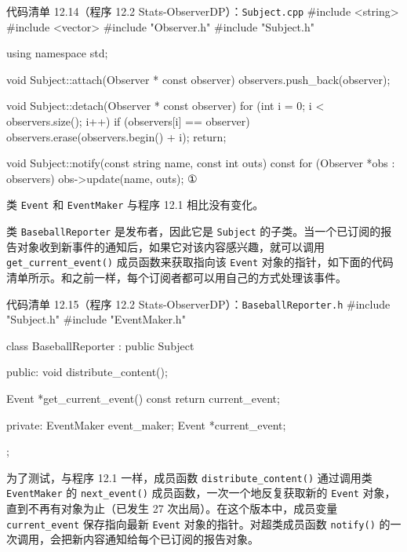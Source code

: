 \begin{codeboxt}{代码清单 12.14（程序 12.2 Stats-ObserverDP）：\texttt{Subject.\allowbreak{}cpp}}
#include <string>
#include <vector>
#include "Observer.h"
#include "Subject.h"

using namespace std;

void Subject::attach(Observer * const observer)
{
    observers.push_back(observer);
}

void Subject::detach(Observer * const observer)
{
    for (int i = 0; i < observers.size(); i++)
    {
        if (observers[i] == observer)
        {
            observers.erase(observers.begin() + i);
            return;
        }
    }
}

void Subject::notify(const string name, const int outs) const
{
    for (Observer *obs : observers) obs->update(name, outs); ①
}
\end{codeboxt}
\par

类 \texttt{Event} 和 \texttt{Event\allowbreak{}Maker} 与程序 12.1 相比没有变化。

类 \texttt{Baseball\allowbreak{}Reporter} 是发布者，因此它是 \texttt{Subject} 的子类。当一个已订阅的报告对象收到新事件的通知后，如果它对该内容感兴趣，就可以调用 \texttt{get\_\allowbreak{}current\_\allowbreak{}event(\allowbreak{})\allowbreak{}} 成员函数来获取指向该 \texttt{Event} 对象的指针，如下面的代码清单所示。和之前一样，每个订阅者都可以用自己的方式处理该事件。

\begin{codeboxt}{代码清单 12.15（程序 12.2 Stats-ObserverDP）：\texttt{Baseball\allowbreak{}Reporter.\allowbreak{}h}}
#include "Subject.h"
#include "EventMaker.h"

class BaseballReporter : public Subject
{
public:
    void distribute_content();

    Event *get_current_event() const { return current_event; }

private:
    EventMaker event_maker;
    Event *current_event;
};
\end{codeboxt}

为了测试，与程序 12.1 一样，成员函数 \texttt{distribute\_\allowbreak{}content(\allowbreak{})\allowbreak{}} 通过调用类 \texttt{Event\allowbreak{}Maker} 的 \texttt{next\_\allowbreak{}event(\allowbreak{})\allowbreak{}} 成员函数，一次一个地反复获取新的 \texttt{Event} 对象，直到不再有对象为止（已发生 27 次出局）。在这个版本中，成员变量 \texttt{current\_\allowbreak{}event} 保存指向最新 \texttt{Event} 对象的指针。对超类成员函数 \texttt{notify()} 的一次调用，会把新内容通知给每个已订阅的报告对象。

